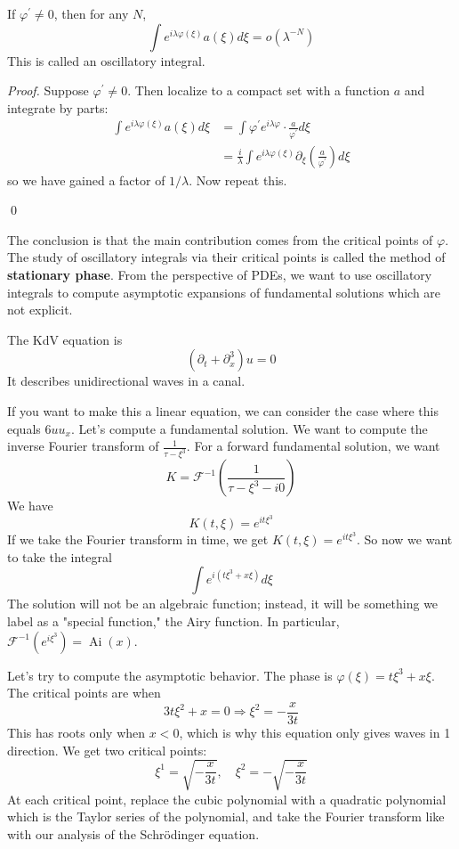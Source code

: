 \begin{proposition}
    If $\varphi^{\prime} \neq 0$, then for any $N$,
    $$
    \int e^{i \lambda \varphi(\xi)} a(\xi) d \xi=o\left(\lambda^{-N}\right)
    $$
    This is called an oscillatory integral.
\end{proposition}
\begin{proof}
    Suppose $\varphi^{\prime} \neq 0$. Then localize to a compact set with a function $a$ and integrate by parts:
    $$
    \begin{aligned}
    \int e^{i \lambda \varphi(\xi)} a(\xi) d\xi &=\int \varphi^{\prime} e^{i \lambda \varphi} \cdot \frac{a}{\varphi^{\prime}} d \xi \\
    &=\frac{i}{\lambda} \int e^{i \lambda \varphi(\xi)} \partial_{\xi}\left(\frac{a}{\varphi^{\prime}}\right) d \xi
    \end{aligned}
    $$
    so we have gained a factor of $1 / \lambda$. Now repeat this. 

    \qed
\end{proof}

The conclusion is that the main contribution comes from the critical points of $\varphi$. The study of oscillatory integrals via their critical points is called the method of \textbf{stationary phase}.  From the perspective of PDEs, we want to use oscillatory integrals to compute asymptotic expansions of fundamental solutions which are not explicit.


\begin{example}
The KdV equation is
$$
\left(\partial_{t}+\partial_{x}^{3}\right) u=0
$$
It describes unidirectional waves in a canal.

If you want to make this a linear equation, we can consider the case where this equals $6 u u_{x}$. Let's compute a fundamental solution. We want to compute the inverse Fourier transform of $\frac{1}{\tau-\xi^{3}} .$ For a forward fundamental solution, we want
$$
K=\mathcal{F}^{-1}\left(\frac{1}{\tau-\xi^{3}-i 0}\right)
$$
We have
$$
K(t, \xi)=e^{i t \xi^{3}}
$$
If we take the Fourier transform in time, we get $K(t, \xi)=e^{i t \xi^{3}}$. So now we want to take the integral
$$
\int e^{i\left(t \xi^{3}+x \xi\right)} d \xi
$$
The solution will not be an algebraic function; instead, it will be something we label as a "special function," the Airy function. In particular, $\mathcal{F}^{-1}\left(e^{i \xi^{3}}\right)=\operatorname{Ai}(x)$.

Let's try to compute the asymptotic behavior. The phase is $\varphi(\xi)=t \xi^{3}+x \xi$. The critical points are when
$$
3 t \xi^{2}+x=0 \Longrightarrow \xi^{2}=-\frac{x}{3 t}
$$
This has roots only when $x<0$, which is why this equation only gives waves in 1 direction. We get two critical points:
$$
\xi^{1}=\sqrt{-\frac{x}{3 t}}, \quad \xi^{2}=-\sqrt{-\frac{x}{3 t}}
$$
At each critical point, replace the cubic polynomial with a quadratic polynomial which is the Taylor series of the polynomial, and take the Fourier transform like with our analysis of the Schrödinger equation.
\end{example}

